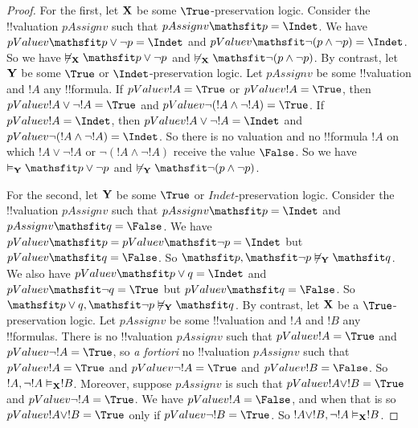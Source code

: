 \documentclass[../../../include/open-logic-section]{subfiles}
\begin{document}
\begin{proof}
For the first, let $\Log X$ be some $\True$-preservation logic. Consider the !!{valuation} $pAssign{v}$ such that $pAssign{v}{\Obj p} = \Indet$. We have $pValue{v}{\Obj{p \lor \lnot p}} = \Indet$ and  $pValue{v}{\Obj{\lnot (p \land \lnot p)}} = \Indet$. So we have $\not \Entails[\Log X] \Obj{p \lor \lnot p}$ and $\not \Entails[\Log X] \Obj{\lnot (p \land \lnot p)}$. By contrast, let $\Log Y$ be some $\True$ or $\Indet$-preservation logic. Let $pAssign{v}$ be some !!{valuation} and $!A$ any !!{formula}. If $pValue{v}{!A} = \True$ or $pValue{v}{!A} = \True$, then $pValue{v}{!A \lor \lnot !A} = \True$ and $pValue{v}{\lnot (!A \land \lnot !A)} = \True$. If $pValue{v}{!A} = \Indet$, then $pValue{v}{!A \lor \lnot !A} = \Indet$ and $pValue{v}{\lnot (!A \land \lnot !A)} = \Indet$. So there is no valuation and no !!{formula} $!A$ on which $!A \lor \lnot !A$ or $\lnot (!A \land \lnot !A)$ receive the value $\False$. So we have $\Entails[\Log Y] \Obj{p \lor \lnot p}$ and $\not \Entails[\Log Y] \Obj{\lnot (p \land \lnot p)}$.

For the second, let $\Log Y$ be some $\True$ or $Indet$-preservation logic. Consider the !!{valuation} $pAssign{v}$ such that $pAssign{v}{\Obj p} = \Indet$ and $pAssign{v}{\Obj q} = \False$. We have $pValue{v}{\Obj{p}} = pValue{v}{\Obj{\lnot p}} = \Indet$ but $pValue{v}{\Obj{q}} = \False$. So $\Obj{p}, \Obj{\lnot p} \not \Entails[\Log Y] \Obj{q}$. We also have $pValue{v}{\Obj{p \lor q}} = \Indet$ and $pValue{v}{\Obj{\lnot q}} = \True$ but $pValue{v}{\Obj{q}} = \False$. So $\Obj{p \lor q}, \Obj{\lnot p} \not \Entails[\Log Y] \Obj{q}$. By contrast, let $\Log X$ be a $\True$-preservation logic. Let $pAssign{v}$ be some !!{valuation} and $!A$ and $!B$ any !!{formula}s. There is no !!{valuation} $pAssign{v}$ such that $pValue{v}{!A} = \True$ and $pValue{v}{\lnot !A} = \True$, so \emph{a fortiori} no !!{valuation} $pAssign{v}$ such that $pValue{v}{!A} = \True$ and $pValue{v}{\lnot !A} = \True$ and $pValue{v}{!B} = \False$. So $!A, \lnot !A \Entails[\Log X] !B$. Moreover, suppose $pAssign{v}$ is such that $pValue{v}{!A \lor !B} = \True$ and $pValue{v}{\lnot !A} = \True$. We have $pValue{v}{!A} = \False$, and when that is so $pValue{v}{!A \lor !B} = \True$ only if $pValue{v}{\lnot !B} = \True$. So $!A \lor !B, \lnot !A \Entails[\Log X] !B$.

\end{proof}
\end{document}
